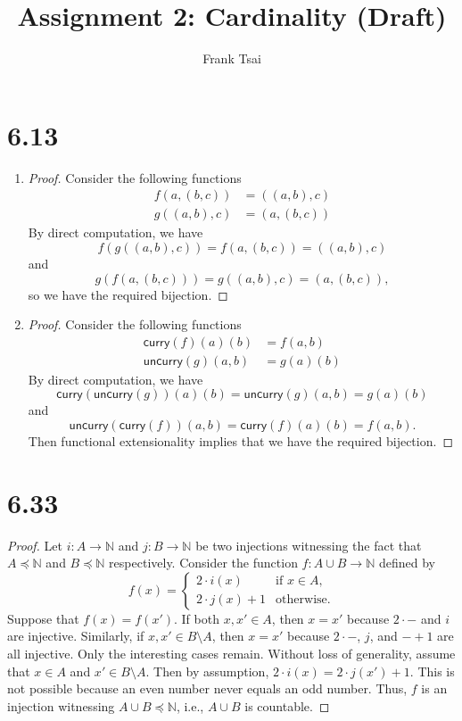 \documentclass[a4paper]{article}
\title{Assignment 2: Cardinality (Draft)}
\author{Frank Tsai}
\newcommand{\curry}{\mathsf{curry}}
\newcommand{\uncurry}{\mathsf{uncurry}}
\newcommand{\N}{\mathbb{N}}
\newcommand{\To}[3]{#1\colon#2\to#3}
\begin{document}
\maketitle

\section*{6.13}
\begin{enumerate}
\item
  \begin{proof}
    Consider the following functions
    \begin{align*}
      f(a,(b,c)) &= ((a,b),c)\\
      g((a,b),c) &= (a,(b,c))
    \end{align*}
    By direct computation, we have \[f(g((a,b),c)) = f(a,(b,c)) = ((a,b),c)\] and \[g(f(a,(b,c))) = g((a,b),c) = (a,(b,c)),\] so we have the required bijection.
  \end{proof}
\item
  \begin{proof}
    Consider the following functions
    \begin{align*}
      \curry(f)(a)(b) &= f(a,b)\\
      \uncurry(g)(a,b) &= g(a)(b)
    \end{align*}
    By direct computation, we have \[\curry(\uncurry(g))(a)(b) = \uncurry(g)(a,b) = g(a)(b)\] and \[\uncurry(\curry(f))(a,b) = \curry(f)(a)(b) = f(a,b).\]
    Then functional extensionality implies that we have the required bijection.
  \end{proof}
\end{enumerate}

\section*{6.33}
\begin{proof}
  Let $\To{i}{A}{\N}$ and $\To{j}{B}{\N}$ be two injections witnessing the fact that $A \preceq \N$ and $B \preceq \N$ respectively.
  Consider the function $\To{f}{A \cup B}{\N}$ defined by \[
    f(x) =
    \begin{cases}
      2 \cdot i(x) & \text{if $x \in A$,}\\
      2 \cdot j(x) + 1 & \text{otherwise.}
    \end{cases}
  \]
  Suppose that $f(x) = f(x')$.
  If both $x, x' \in A$, then $x = x'$ because $2 \cdot -$ and $i$ are injective.
  Similarly, if $x, x' \in B \setminus A$, then $x = x'$ because $2 \cdot -$, $j$, and $- + 1$ are all injective.
  Only the interesting cases remain.
  Without loss of generality, assume that $x \in A$ and $x' \in B \setminus A$.
  Then by assumption, $2 \cdot i(x) = 2 \cdot j(x') + 1$.
  This is not possible because an even number never equals an odd number.
  Thus, $f$ is an injection witnessing $A \cup B \preceq \N$, i.e., $A \cup B$ is countable.
\end{proof}
\end{document}
